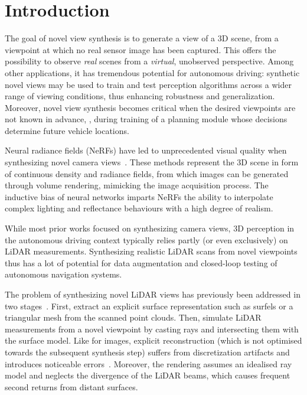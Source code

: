 \section{Introduction}
\label{sec:intro}

The goal of novel view synthesis is to generate a view of a 3D scene, from a viewpoint at which no real sensor image has been captured. This offers the possibility to observe \emph{real} scenes from a \emph{virtual}, unobserved perspective. Among other applications, it has tremendous potential for autonomous driving: synthetic novel views may be used to train and test perception algorithms across a wider range of viewing conditions, thus enhancing robustness and generalization. Moreover, novel view synthesis becomes critical when the desired viewpoints are not known in advance, \eg, during training of a planning module whose decisions determine future vehicle locations.

Neural radiance fields (NeRFs) have led to unprecedented visual quality when synthesizing novel camera views~\cite{mildenhall2020nerf, barron2021mip, yu2021plenoxels, mueller2022instant}. These methods represent the 3D scene in form of continuous density and radiance fields, from which images can be generated through volume rendering, mimicking the image acquisition process. The inductive bias of neural networks imparts NeRFs the ability to interpolate complex lighting and reflectance behaviours with a high degree of realism.

While most prior works focused on synthesizing camera views, 3D perception in the autonomous driving context typically relies partly (or even exclusively) on LiDAR measurements. Synthesizing realistic LiDAR scans from novel viewpoints thus has a lot of potential for data augmentation and closed-loop testing of autonomous navigation systems.

The problem of synthesizing novel LiDAR views has previously been addressed in two stages~\cite{manivasagam2020lidarsim}. First, extract an explicit surface representation such as surfels or a triangular mesh from the scanned point clouds. Then, simulate LiDAR measurements from a novel viewpoint by casting rays and intersecting them with the surface model.
Like for images, explicit reconstruction (which is not optimised towards the subsequent synthesis step) suffers from discretization artifacts and introduces noticeable errors~\cite{waechter2014let}. Moreover, the rendering assumes an idealised ray model and neglects the divergence of the LiDAR beams, which causes frequent second returns from distant surfaces. 

